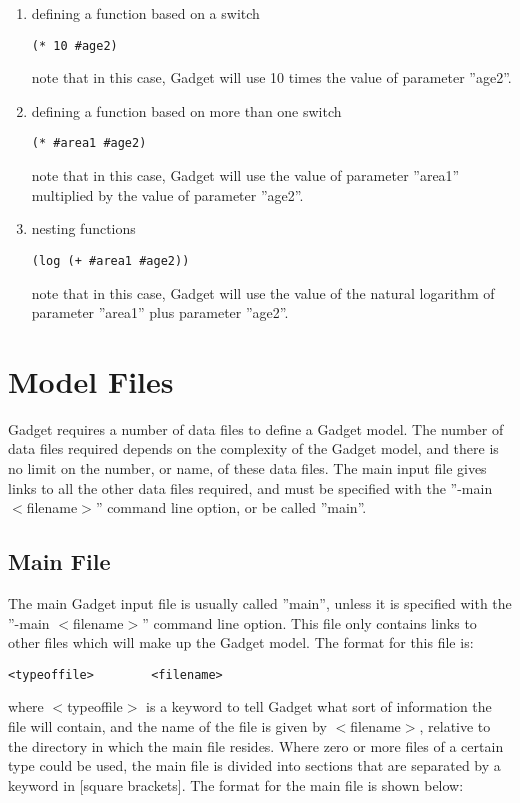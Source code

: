 \documentclass[10pt,twoside]{book}
\begin{document}
\begin{enumerate}
\item defining a function based on a switch
{\small\begin{verbatim}
(* 10 #age2)
\end{verbatim}}
note that in this case, Gadget will use 10 times the value of parameter ''age2''.
\item defining a function based on more than one switch
{\small\begin{verbatim}
(* #area1 #age2)
\end{verbatim}}
note that in this case, Gadget will use the value of parameter ''area1'' multiplied by the value of parameter ''age2''.
\item nesting functions
{\small\begin{verbatim}
(log (+ #area1 #age2))
\end{verbatim}}
note that in this case, Gadget will use the value of the natural logarithm of parameter ''area1'' plus parameter ''age2''.
\end{enumerate}

\chapter{Model Files}\label{chap:model}
Gadget requires a number of data files to define a Gadget model.  The number of data files required depends on the complexity of the Gadget model, and there is no limit on the number, or name, of these data files.  The main input file gives links to all the other data files required, and must be specified with the ''-main $<$filename$>$'' command line option, or be called ''main''.

\section{Main File}\label{sec:mainfile}
The main Gadget input file is usually called ''main'', unless it is specified with the ''-main $<$filename$>$'' command line option.  This file only contains links to other files which will make up the Gadget model.  The format for this file is:

{\small\begin{verbatim}
<typeoffile>        <filename>
\end{verbatim}}

where $<$typeoffile$>$ is a keyword to tell Gadget what sort of information the file will contain, and the name of the file is given by $<$filename$>$, relative to the directory in which the main file resides.  Where zero or more files of a certain type could be used, the main file is divided into sections that are separated by a keyword in [square brackets].  The format for the main file is shown below:
\end{document}
